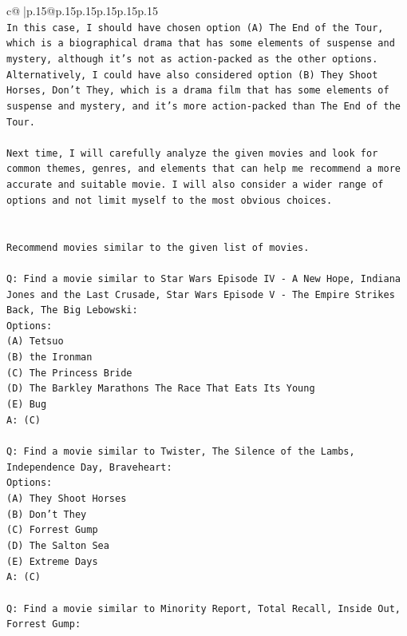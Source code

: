\documentclass{article}
\begin{document}
{\begin{supertabular}{c@{$\;$}|p{.15\linewidth}@{}p{.15\linewidth}p{.15\linewidth}p{.15\linewidth}p{.15\linewidth}p{.15\linewidth}}
{{{\\ 
\texttt{In this case, I should have chosen option (A) The End of the Tour, which is a biographical drama that has some elements of suspense and mystery, although it's not as action{-}packed as the other options. Alternatively, I could have also considered option (B) They Shoot Horses, Don't They, which is a drama film that has some elements of suspense and mystery, and it's more action{-}packed than The End of the Tour. } \\
\\ 
\texttt{Next time, I will carefully analyze the given movies and look for common themes, genres, and elements that can help me recommend a more accurate and suitable movie. I will also consider a wider range of options and not limit myself to the most obvious choices.} \\
\\ 
\\ 
\texttt{Recommend movies similar to the given list of movies.} \\
\\ 
\texttt{Q: Find a movie similar to Star Wars Episode IV {-} A New Hope, Indiana Jones and the Last Crusade, Star Wars Episode V {-} The Empire Strikes Back, The Big Lebowski:} \\
\texttt{Options:} \\
\texttt{(A) Tetsuo} \\
\texttt{(B) the Ironman} \\
\texttt{(C) The Princess Bride} \\
\texttt{(D) The Barkley Marathons The Race That Eats Its Young} \\
\texttt{(E) Bug} \\
\texttt{A: (C)} \\
\\ 
\texttt{Q: Find a movie similar to Twister, The Silence of the Lambs, Independence Day, Braveheart:} \\
\texttt{Options:} \\
\texttt{(A) They Shoot Horses} \\
\texttt{(B) Don't They} \\
\texttt{(C) Forrest Gump} \\
\texttt{(D) The Salton Sea} \\
\texttt{(E) Extreme Days} \\
\texttt{A: (C)} \\
\\ 
\texttt{Q: Find a movie similar to Minority Report, Total Recall, Inside Out, Forrest Gump:} \\
}}}
\end{supertabular}}
\end{document}
